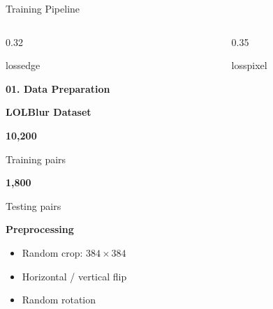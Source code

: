 ﻿\documentclass[
    11pt,%
    aspectratio=169,%
]{beamer}
\begin{document}
\begin{frame}{Training Pipeline}

\scriptsize


\begin{columns}[T,onlytextwidth]


\begin{column}{0.32\textwidth}

\begin{beamercolorbox}[
    wd=\linewidth,
    sep=0.09cm,
    rounded=true,
    center
]{lossedge}

    {\color{LossNavy}\bfseries 01. Data Preparation}

\end{beamercolorbox}

\vspace{0.10cm}

{\color{LossNavy}\bfseries LOLBlur Dataset}

\vspace{0.02cm}

{\color{LossNavy}\bfseries\Large 10,200}

Training pairs

\vspace{0.05cm}

{\color{LossNavy}\bfseries\Large 1,800}

Testing pairs

\vspace{0.10cm}

\textbf{Preprocessing}

\begin{itemize}
    \setlength{\itemsep}{1pt}
    \setlength{\topsep}{2pt}
    \item Random crop: $384\times384$
    \item Horizontal / vertical flip
    \item Random rotation
\end{itemize}

\end{column}


\begin{column}{0.35\textwidth}

\begin{beamercolorbox}[
    wd=\linewidth,
    sep=0.09cm,
    rounded=true,
    center
]{losspixel}


\end{beamercolorbox}
\end{column}
\end{columns}
\end{frame}
\end{document}
